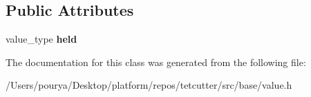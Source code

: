 \subsection*{Public Attributes}
\begin{DoxyCompactItemize}
\item 
\hypertarget{classps_1_1PRIVATE_1_1holder_a51697997f55281b74d08b4f5b5e72553}{}value\+\_\+type {\bfseries held}\label{classps_1_1PRIVATE_1_1holder_a51697997f55281b74d08b4f5b5e72553}

\end{DoxyCompactItemize}


The documentation for this class was generated from the following file\+:\begin{DoxyCompactItemize}
\item 
/\+Users/pourya/\+Desktop/platform/repos/tetcutter/src/base/value.\+h\end{DoxyCompactItemize}
